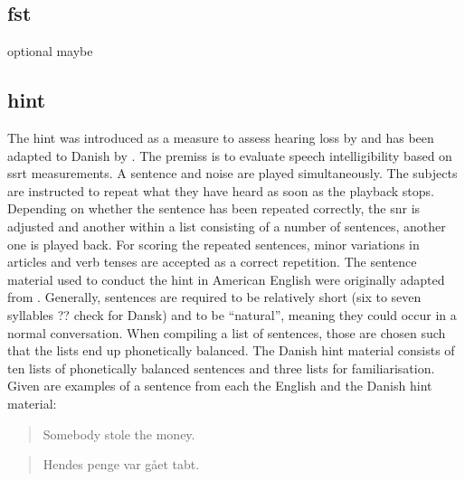 \subsection{\gls{fst}}\label{ssec:fst}
optional maybe
\subsection{\gls{hint}}\label{ssec:hint}
The \gls{hint} was introduced as a measure to assess hearing loss by \citep{nilsson_95} and has been adapted to Danish by \citep{hint_2011}.
The premiss is to evaluate speech intelligibility based on \gls{ssrt} measurements. 
A sentence and noise are played simultaneously. The subjects are instructed to repeat what they have heard as soon as the playback stops. 
Depending on whether the sentence has been repeated correctly, the \gls{snr} is adjusted and another within a list consisting of a number of sentences, another one is played back.
For scoring the repeated sentences, minor variations in articles and verb tenses are accepted as a correct repetition.
The sentence material used to conduct the \gls{hint} in American English were originally adapted from \citep{bench_bamford_79}. 
Generally, sentences are required to be relatively short (six to seven syllables ?? check for Dansk) and to be \enquote{natural}, meaning they could occur in a normal conversation.
When compiling a list of sentences, those are chosen such that the lists end up phonetically balanced.
The Danish \gls{hint} material consists of ten lists of phonetically balanced sentences and three lists for familiarisation.
Given are examples of a sentence from each the English and the Danish \gls{hint} material:
\begin{quote}
Somebody stole the money.
\end{quote}
\begin{quote}
Hendes penge var gået tabt.
\end{quote}

